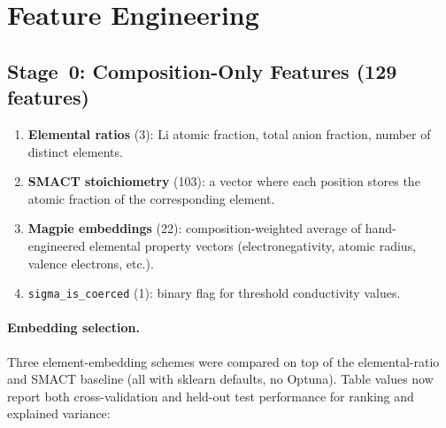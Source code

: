 \documentclass[11pt,a4paper]{article}
\begin{document}
\section{Feature Engineering}

\subsection{Stage~0: Composition-Only Features (129 features)}

\begin{enumerate}[leftmargin=*]
      \item \textbf{Elemental ratios} (3): Li atomic fraction, total anion
            fraction, number of distinct elements.
      \item \textbf{SMACT stoichiometry} (103): a vector where each position
            stores the atomic fraction of the corresponding element.
      \item \textbf{Magpie embeddings} (22): composition-weighted average of
            hand-engineered elemental property vectors (electronegativity, atomic
            radius, valence electrons, etc.).
      \item \texttt{sigma\_is\_coerced} (1): binary flag for threshold
            conductivity values.
\end{enumerate}

\paragraph{Embedding selection.}
Three element-embedding schemes were compared on top of the elemental-ratio
and SMACT baseline (all with sklearn defaults, no Optuna).  Table values now
report both cross-validation and held-out test performance for ranking and
explained variance:
\end{document}
